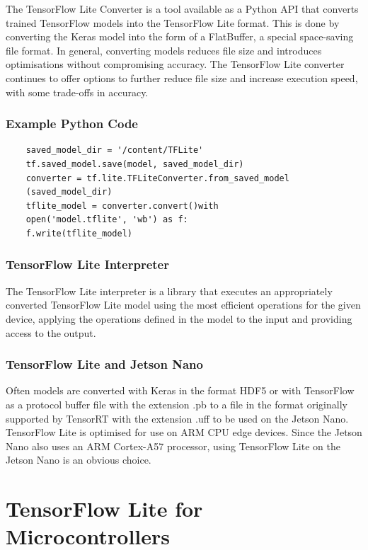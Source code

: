 The TensorFlow Lite Converter is a tool available as a Python API that converts trained TensorFlow models into the TensorFlow Lite format. This is done by converting the Keras model into the form of a FlatBuffer, a special space-saving file format. In general, converting models reduces file size and introduces optimisations without compromising accuracy. The TensorFlow Lite converter continues to offer options to further reduce file size and increase execution speed, with some trade-offs in accuracy. \cite{GoogleTensorFlow:2022}
\subsubsection{Example Python Code}
\begin{lstlisting}
	saved_model_dir = '/content/TFLite'
	tf.saved_model.save(model, saved_model_dir)
	converter = tf.lite.TFLiteConverter.from_saved_model
	(saved_model_dir)
	tflite_model = converter.convert()with
	open('model.tflite', 'wb') as f:
	f.write(tflite_model)
\end{lstlisting}

\subsubsection{TensorFlow Lite Interpreter}

The TensorFlow Lite interpreter is a library that executes an appropriately converted TensorFlow Lite model using the most efficient operations for the given device, applying the operations defined in the model to the input and providing access to the output. \cite{GoogleTensorFlow:2022}

\subsubsection{TensorFlow Lite and Jetson Nano}
Often models are converted with Keras in the format HDF5 or with TensorFlow as a protocol buffer file with the extension .pb to a file in the format originally supported by TensorRT with the extension .uff to be used on the Jetson Nano. TensorFlow Lite is optimised for use on ARM CPU edge devices. Since the Jetson Nano also uses an ARM Cortex-A57 processor, using TensorFlow Lite on the Jetson Nano is an obvious choice.

\section{TensorFlow Lite for Microcontrollers}
